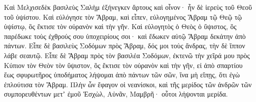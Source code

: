 {\par }{\PP {}Καὶ Μελχισεδὲκ βασιλεὺς Σαλὴμ ἐξήνεγκεν ἄρτους καὶ οἶνον· ἦν δὲ ἱερεὺς τοῦ Θεοῦ τοῦ ὑψίστου.
Καὶ εὐλόγησε τὸν Ἅβραμ, καὶ εἶπεν, εὐλογημένος Ἅβραμ τῷ Θεῷ τῷ ὑψίστῳ, ὃς ἔκτισε τὸν οὐρανὸν καὶ τὴν γῆν.
Καὶ εὐλογητὸς ὁ Θεὸς ὁ ὕψιστος, ὃς παρέδωκε τοὺς ἐχθρούς σου ὑποχειρίους σοι· καὶ ἔδωκεν αὐτῷ Ἅβραμ δεκάτην ἀπὸ πάντων.
Εἶπε δὲ βασιλεὺς Σοδόμων πρὸς Ἅβραμ, δός μοι τοὺς ἄνδρας, τὴν δὲ ἵππον λάβε σεαυτῷ.
Εἶπε δὲ Ἅβραμ πρὸς τὸν βασιλέα Σοδόμων, ἐκτενῶ τὴν χεῖρά μου πρὸς Κύπιον τὸν Θεὸν τὸν ὕψιστον, ὃς ἔκτισε τὸν οὐρανὸν καὶ τὴν γῆν,
εἰ ἀπὸ σπαρτίου ἕως σφυρωτῆρος ὑποδήματος λήψομαι ἀπὸ πάντων τῶν σῶν, ἵνα μὴ εἴπῃς, ὅτι ἐγὼ ἐπλούτισα τὸν Ἅβραμ.
Πλὴν ὧν ἔφαγον οἱ νεανίσκοι, καὶ τῆς μερίδος τῶν ἀνδρῶν τῶν συμπορευθέντων μετʼ ἐμοῦ Ἐσχὼλ, Αὐνᾶν, Μαμβρῆ· οὗτοι λήψονται μερίδα.

}
